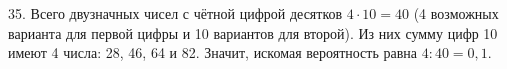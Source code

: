 35. Всего двузначных чисел с чётной цифрой десятков $4\cdot10=40$ (4 возможных варианта для первой цифры и 10 вариантов для второй). Из них сумму цифр 10 имеют
4 числа: 28, 46, 64 и 82. Значит, искомая вероятность равна $4:40=0,1.$\\
